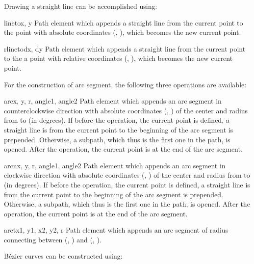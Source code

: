 Drawing a straight line can be accomplished using:

\begin{classdesc}{lineto}{x, y}
Path element which appends a straight line from the current point to the
point with absolute coordinates (, ), which becomes
the new current point.
\end{classdesc}

\begin{classdesc}{rlineto}{dx, dy}
Path element which appends a straight line from the current point to the
a point with relative coordinates (, ), which becomes
the new current point.
\end{classdesc}

For the construction of arc segment, the following three operations
are available:

\begin{classdesc}{arc}{x, y, r, angle1, angle2}
Path element which appends an arc segment in counterclockwise direction
with absolute coordinates (, ) of the center and 
radius  from  to  (in degrees).
If before the operation, the current point is defined, a straight line
is from the current point to the beginning of the arc segment is
prepended. Otherwise, a subpath, which thus is the first one in the
path, is opened. After the operation, the current point is at the end
of the arc segment.
\end{classdesc}

\begin{classdesc}{arcn}{x, y, r, angle1, angle2}
Path element which appends an arc segment in clockwise direction
with absolute coordinates (, ) of the center and 
radius  from  to  (in degrees).
If before the operation, the current point is defined, a straight line
is from the current point to the beginning of the arc segment is
prepended. Otherwise, a subpath, which thus is the first one in the
path, is opened. After the operation, the current point is at the end
of the arc segment.
\end{classdesc}

\begin{classdesc}{arct}{x1, y1, x2, y2, r}
Path element which appends an arc segment of radius 
connecting between (, ) and (, ).\\
\end{classdesc}

B\'ezier curves can be constructed using: \

